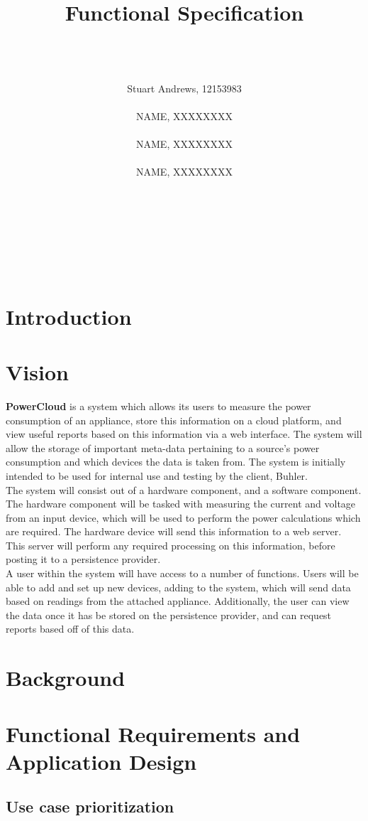\documentclass{article}
\title{Functional Specification}
\author
{  
	\\\\\\
	Stuart Andrews, 12153983 
	\\\\
	NAME, XXXXXXXX
	\\\\
	NAME, XXXXXXXX 
	\\\\
	NAME, XXXXXXXX 
	\\\\\\\\\\\\\\
}
\begin{document}
\maketitle
\thispagestyle{empty}
\newpage
\tableofcontents
\newpage

\section{Introduction}
\section{Vision}
\textbf{PowerCloud} is a system which allows its users to measure the power consumption of an appliance, store this information on a cloud platform, and view useful reports based on this information via a web interface. The system will allow the storage of important meta-data pertaining to a source's power consumption and which devices the data is taken from. The system is initially intended to be used for internal use and testing by the client, Buhler.\\

The system will consist out of a hardware component, and a software component. The hardware component will be tasked with measuring the current and voltage from an input device, which will be used to perform the power calculations which are required. The hardware device will send this information to a web server. This server will perform any required processing on this information, before posting it to a persistence provider.\\

A user within the system will have access to a number of functions. Users will be able to add and set up new devices, adding to the system, which will send data based on readings from the attached appliance. Additionally, the user can view the data once it has be stored on the persistence provider, and can request reports based off of this data.

\section{Background}
\section{Functional Requirements and Application Design}
\subsection{Use case prioritization}
\end{document}
